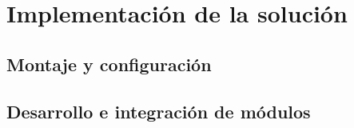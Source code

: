 \section{Implementación de la solución}


\subsection{Montaje y configuración}
\lipsum[1]
\subsection{Desarrollo e integración de módulos}
\lipsum[1]